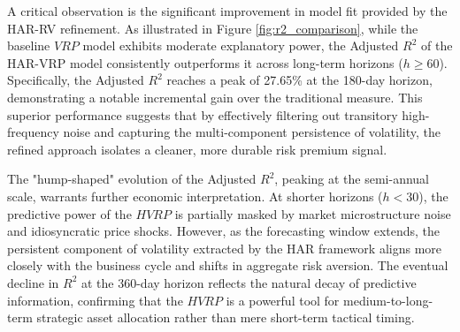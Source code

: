 \documentclass[a4paper, 12pt]{article}    %
\begin{document}
A critical observation is the significant improvement in model fit provided by the HAR-RV refinement. As illustrated in Figure \ref{fig:r2_comparison}, while the baseline $VRP$ model exhibits moderate explanatory power, the Adjusted $R^2$ of the HAR-VRP model consistently outperforms it across long-term horizons ($h \ge 60$). Specifically, the Adjusted $R^2$ reaches a peak of 27.65\% at the 180-day horizon, demonstrating a notable incremental gain over the traditional measure. This superior performance suggests that by effectively filtering out transitory high-frequency noise and capturing the multi-component persistence of volatility, the refined approach isolates a cleaner, more durable risk premium signal.

The "hump-shaped" evolution of the Adjusted $R^2$, peaking at the semi-annual scale, warrants further economic interpretation. At shorter horizons ($h < 30$), the predictive power of the $HVRP$ is partially masked by market microstructure noise and idiosyncratic price shocks. However, as the forecasting window extends, the persistent component of volatility extracted by the HAR framework aligns more closely with the business cycle and shifts in aggregate risk aversion. The eventual decline in $R^2$ at the 360-day horizon reflects the natural decay of predictive information, confirming that the $HVRP$ is a powerful tool for medium-to-long-term strategic asset allocation rather than mere short-term tactical timing.
\end{document}
